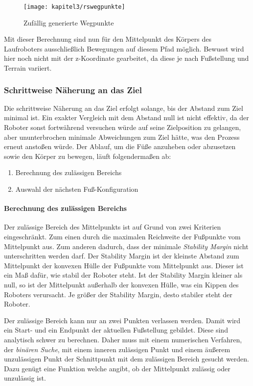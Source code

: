 \begin{figure}[b!]
  \centering
  \texttt{[image: kapitel3/rswegpunkte]}
  \caption{Zufällig generierte Wegpunkte}
  \label{Kap3:RSWegpunkte}
\end{figure}

Mit dieser Berechnung sind nun für den Mittelpunkt des Körpers des Laufroboters ausschließlich Bewegungen auf diesem Pfad möglich. Bewusst wird hier noch nicht mit der z-Koordinate gearbeitet, da diese je nach Fußstellung und Terrain variiert.

\subsubsection{Schrittweise Näherung an das Ziel}

Die schrittweise Näherung an das Ziel erfolgt solange, bis der Abstand zum Ziel minimal ist. Ein exakter Vergleich mit dem Abstand null ist nicht effektiv, da der Roboter sonst fortwährend versuchen würde auf seine Zielposition zu gelangen, aber ununterbrochen minimale Abweichungen zum Ziel hätte, was den Prozess erneut anstoßen würde. Der Ablauf, um die Füße anzuheben oder abzusetzen sowie den Körper zu bewegen, läuft folgendermaßen ab:
\begin{enumerate}
  \item Berechnung des zulässigen Bereichs
  \item Auswahl der nächsten Fuß-Konfiguration
\end{enumerate}

\paragraph{Berechnung des zulässigen Bereichs}

Der zulässige Bereich des Mittelpunkts ist auf Grund von zwei Kriterien eingeschränkt. Zum einen durch die maximalen Reichweite der Fußpunkte vom Mittelpunkt aus. Zum anderen dadurch, dass der minimale \emph{Stability Margin} nicht unterschritten werden darf. Der Stability Margin ist der kleinste Abstand zum Mittelpunkt der konvexen Hülle der Fußpunkte vom Mittelpunkt aus. Dieser ist ein Maß dafür, wie stabil der Roboter steht. Ist der Stability Margin kleiner als null, so ist der Mittelpunkt außerhalb der konvexen Hülle, was ein Kippen des Roboters verursacht. Je größer der Stability Margin, desto stabiler steht der Roboter.

Der zulässige Bereich kann nur an zwei Punkten verlassen werden. Damit wird ein Start- und ein Endpunkt der aktuellen Fußstellung gebildet. Diese sind analytisch schwer zu berechnen. Daher muss mit einem numerischen Verfahren, der \emph{binären Suche}, mit einem inneren zulässigen Punkt und einem äußerem unzulässigen Punkt der Schnittpunkt mit dem zulässigen Bereich gesucht werden. Dazu genügt eine Funktion welche angibt, ob der Mittelpunkt zulässig oder unzulässig ist.

